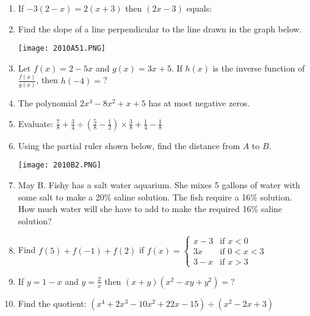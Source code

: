 \documentclass[../uilmath.tex]{subfiles}
\begin{document}
\begin{enumerate}[label=\bfseries\arabic*.]
        \item %
        If $-3(2-x)=2(x+3)$ then $(2x-3)$ equals:

        \item %
        Find the slope of a line perpendicular to the line drawn in the graph below.
        \begin{center}
            \texttt{[image: 2010A51.PNG]}
        \end{center}

        \item %
        Let $f(x)=2-5x$ and $g(x)=3x+5$. If $h(x)$ is the inverse function of $\frac{f(x)}{g(x)}$, then $h(-4)=$?

        \item %
        The polynomial $2x^4-8x^2+x+5$ has at most \blank negative zeros.

        \item %
        Evaluate: $\frac{7}{8}+\frac{3}{4}\div(\frac{5}{8}-\frac{1}{2})\times \frac{3}{8}+\frac{1}{4}-\frac{1}{8}$

        \item %
        Using the partial ruler shown below, find the distance from $A$ to $B$.
        \begin{center}
            \texttt{[image: 2010B2.PNG]}
        \end{center}

        \item %
        May B. Fishy has a salt water aquarium. She mixes 5 gallons of water with some salt to make a 20\% saline solution.
        The fish require a 16\% solution. How much water will she have to add to make the required 16\% saline solution?

        \item %
        Find $f(5)+f(-1)+f(2)$ if 
        $f(x)=\begin{cases}
            x - 3 & \text{if } x<0\\
            3x & \text{if } 0<x<3 \\
            3-x  & \text{if } x>3
        \end{cases}$

        \item %
        If $y=1-x$ and $y=\frac{2}{x}$ then $(x+y)(x^2-xy+y^2)=$?

        \item %
        Find the quotient: $(x^4+2x^3-10x^2+22x-15)\div (x^2-2x+3)$


\end{enumerate}
\end{document}
